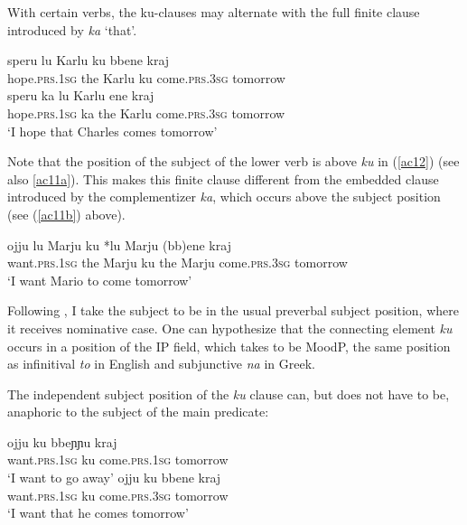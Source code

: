 \documentclass[output=paper]{langscibook}
\begin{document}
With certain verbs, the ku-clauses may alternate with the full finite clause introduced by \textit{ka} ‘that’.

\ea\label{ac11}
    \ea \label{ac11a}\gll speru   lu  Karlu   ku  bbene      kraj \\
       hope.\textsc{prs}.\textsc{1sg}    the  Karlu   ku  come.\textsc{prs}.\textsc{3sg}  tomorrow\\
    \ex \label{ac11b}\gll speru       ka   lu  Karlu ene       kraj \\
     hope.\textsc{prs}.\textsc{1sg}    ka   the  Karlu  come.\textsc{prs}.\textsc{3sg}  tomorrow\\
   \glt ‘I hope that Charles comes tomorrow’
    \z
\z

Note that the position of the subject of the lower verb is above \textit{ku} in (\ref{ac12}) (see also \ref{ac11a}). This makes this finite clause different from the embedded clause introduced by the complementizer \textit{ka}, which occurs above the subject position (see (\ref{ac11b}) above).

\ea\label{ac12}
\gll ojju   {lu Marju} ku {*lu Marju} (bb)ene  kraj \\
 want.\textsc{prs}.\textsc{1sg} {the Marju} ku {the Marju}  come.\textsc{prs}.\textsc{3sg} tomorrow\\
\glt ‘I want Mario to come tomorrow’
\z

Following \citet[36]{calabrese1993a}, I take the subject to be in the usual preverbal subject position, where it receives nominative case.  One can hypothesize that the connecting element \textit{ku} occurs in a position of the IP field, which \citet{roberts2003a} takes to be MoodP, the same position as infinitival \textit{to} in English and subjunctive \textit{na} in Greek.

The independent subject position of the \textit{ku} clause can, but does not have to be, anaphoric to the subject of the main predicate:

\ea \label{ac13}
    \ea \label{ac13a}
        \gll ojju          ku   bbeɲɲu      kraj\\
   want.\textsc{prs}.\textsc{1sg}   ku    come.\textsc{prs}.\textsc{1sg}  tomorrow\\
    \glt   ‘I want to go away’
    \ex \label{ac13b}
        \gll ojju          ku   bbene       kraj \\
   want.\textsc{prs}.\textsc{1sg}   ku   come.\textsc{prs}.\textsc{3sg}  tomorrow\\
    \glt ‘I want that he comes tomorrow’
    \z
\z
\end{document}
